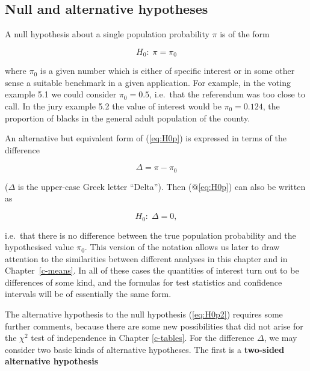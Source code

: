 \documentclass[11pt,a4paper,openany]{book}
\begin{document}
\subsection{Null and alternative
hypotheses}\label{ss-probs-test1sample-hypotheses}

A null hypothesis about a single population probability \(\pi\) is of
the form

\begin{equation}H_{0}:\; \pi=\pi_{0}
\label{eq:H0p}\end{equation}

where \(\pi_{0}\) is a given number which is either of specific interest
or in some other sense a suitable benchmark in a given application. For
example, in the voting example 5.1 we could consider \(\pi_{0}=0.5\),
i.e.~that the referendum was too close to call. In the jury example 5.2
the value of interest would be \(\pi_{0}=0.124\), the proportion of
blacks in the general adult population of the county.

An alternative but equivalent form of (\ref{eq:H0p}) is expressed in
terms of the difference

\begin{equation}\Delta=\pi-\pi_{0}
\label{eq:Dp}\end{equation}

(\(\Delta\) is the upper-case Greek letter ``Delta''). Then
(@\ref{eq:H0p}) can also be written as

\begin{equation}H_{0}: \; \Delta=0,
\label{eq:H0p2}\end{equation}

i.e.~that there is no difference between the true population probability
and the hypothesised value \(\pi_{0}\). This version of the notation
allows us later to draw attention to the similarities between different
analyses in this chapter and in Chapter~\ref{c-means}. In all of these
cases the quantities of interest turn out to be differences of some
kind, and the formulas for test statistics and confidence intervals will
be of essentially the same form.

The alternative hypothesis to the null hypothesis (\ref{eq:H0p2})
requires some further comments, because there are some new possibilities
that did not arise for the \(\chi^{2}\) test of independence in Chapter
\ref{c-tables}. For the difference \(\Delta\), we may consider two basic
kinds of alternative hypotheses. The first is a \textbf{two-sided
alternative hypothesis}
\end{document}
